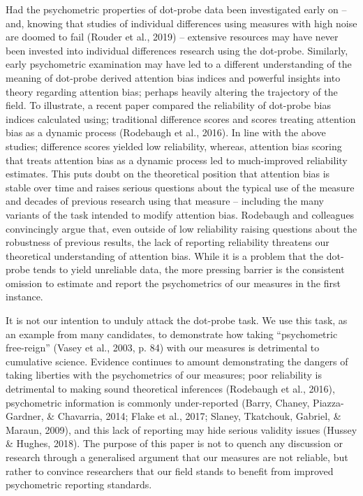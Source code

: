 \documentclass[english,,man,floatsintext]{apa6}
\begin{document}
Had the psychometric properties of dot-probe data been investigated early on -- and, knowing that studies of individual differences using measures with high noise are doomed to fail (Rouder et al., 2019) -- extensive resources may have never been invested into individual differences research using the dot-probe. Similarly, early psychometric examination may have led to a different understanding of the meaning of dot-probe derived attention bias indices and powerful insights into theory regarding attention bias; perhaps heavily altering the trajectory of the field. To illustrate, a recent paper compared the reliability of dot-probe bias indices calculated using; traditional difference scores and scores treating attention bias as a dynamic process (Rodebaugh et al., 2016). In line with the above studies; difference scores yielded low reliability, whereas, attention bias scoring that treats attention bias as a dynamic process led to much-improved reliability estimates. This puts doubt on the theoretical position that attention bias is stable over time and raises serious questions about the typical use of the measure and decades of previous research using that measure -- including the many variants of the task intended to modify attention bias. Rodebaugh and colleagues convincingly argue that, even outside of low reliability raising questions about the robustness of previous results, the lack of reporting reliability threatens our theoretical understanding of attention bias. While it is a problem that the dot-probe tends to yield unreliable data, the more pressing barrier is the consistent omission to estimate and report the psychometrics of our measures in the first instance.

It is not our intention to unduly attack the dot-probe task. We use this task, as an example from many candidates, to demonstrate how taking \enquote{psychometric free-reign} (Vasey et al., 2003, p. 84) with our measures is detrimental to cumulative science. Evidence continues to amount demonstrating the dangers of taking liberties with the psychometrics of our measures; poor reliability is detrimental to making sound theoretical inferences (Rodebaugh et al., 2016), psychometric information is commonly under-reported (Barry, Chaney, Piazza-Gardner, \& Chavarria, 2014; Flake et al., 2017; Slaney, Tkatchouk, Gabriel, \& Maraun, 2009), and this lack of reporting may hide serious validity issues (Hussey \& Hughes, 2018). The purpose of this paper is not to quench any discussion or research through a generalised argument that our measures are not reliable, but rather to convince researchers that our field stands to benefit from improved psychometric reporting standards.
\end{document}
